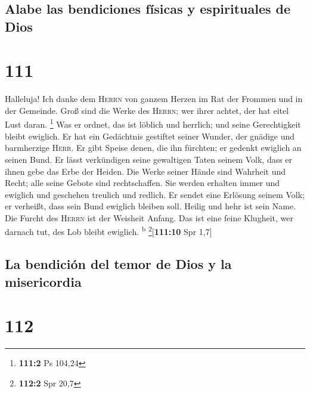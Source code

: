 \hypertarget{alabe-las-bendiciones-fuxedsicas-y-espirituales-de-dios}{%
\subsection{Alabe las bendiciones físicas y espirituales de
Dios}\label{alabe-las-bendiciones-fuxedsicas-y-espirituales-de-dios}}

\hypertarget{section-110}{%
\section{111}\label{section-110}}

 Halleluja! Ich danke dem \textsc{Herrn} von ganzem Herzen
im Rat der Frommen und in der Gemeinde.  Groß sind die
Werke des \textsc{Herrn}; wer ihrer achtet, der hat eitel Lust daran.
\footnote{\textbf{111:2} Ps 104,24}  Was er ordnet, das
ist löblich und herrlich; und seine Gerechtigkeit bleibt ewiglich.
 Er hat ein Gedächtnis gestiftet seiner Wunder, der
gnädige und barmherzige \textsc{Herr}.  Er gibt Speise
denen, die ihn fürchten; er gedenkt ewiglich an seinen Bund.
 Er lässt verkündigen seine gewaltigen Taten seinem Volk,
dass er ihnen gebe das Erbe der Heiden.  Die Werke seiner
Hände sind Wahrheit und Recht; alle seine Gebote sind rechtschaffen.
 Sie werden erhalten immer und ewiglich und geschehen
treulich und redlich.  Er sendet eine Erlösung seinem
Volk; er verheißt, dass sein Bund ewiglich bleiben soll. Heilig und hehr
ist sein Name.  Die Furcht des \textsc{Herrn} ist der
Weisheit Anfang. Das ist eine feine Klugheit, wer darnach tut, des Lob
bleibt ewiglich. \textsuperscript{b} \footnote{\textbf{112:2} Spr 20,7}{[}\textbf{111:10}
Spr 1,7{]}

\hypertarget{la-bendiciuxf3n-del-temor-de-dios-y-la-misericordia}{%
\subsection{La bendición del temor de Dios y la
misericordia}\label{la-bendiciuxf3n-del-temor-de-dios-y-la-misericordia}}

\hypertarget{section-111}{%
\section{112}\label{section-111}}

